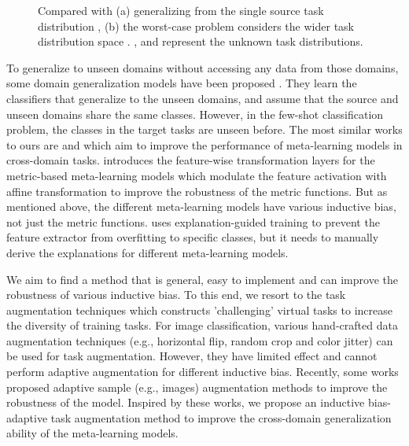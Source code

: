 \documentclass{article}
\begin{document}
\begin{figure}
    \centering
    \caption{Compared with (a) generalizing from the single source task distribution , (b) the worst-case problem considers the wider task distribution space . ,  and  represent the unknown task distributions.}
    \label{fig1}
\end{figure}

To generalize to unseen domains without accessing any data from those domains, some domain generalization models have been proposed \cite{volpi2018generalizing,DBLP:conf/icml/LiYZH19}. They learn the classifiers that generalize to the unseen domains, and assume that the source and unseen domains share the same classes. However, in the few-shot classification problem, the classes in the target tasks are unseen before. The most similar works to ours are \cite{DBLP:conf/iclr/TsengLH020} and \cite{sun2020explanation} which aim to improve the performance of meta-learning models in cross-domain tasks. \cite{DBLP:conf/iclr/TsengLH020} introduces the feature-wise transformation layers for the metric-based meta-learning models which modulate the feature activation with affine transformation to improve the robustness of the metric functions. But as mentioned above, the different meta-learning models have various inductive bias, not just the metric functions. \cite{sun2020explanation}
uses explanation-guided training to prevent the feature extractor from overfitting to specific classes, but it needs to manually derive the explanations for different meta-learning models.

We aim to find a method that is general, easy to implement and can improve the robustness of various inductive bias. To this end, we resort to the task augmentation techniques which constructs 'challenging' virtual tasks to increase the diversity of training tasks. For image classification, various hand-crafted data augmentation techniques (e.g., horizontal flip, random crop and color jitter) can be used for task augmentation. However, they have limited effect and cannot perform adaptive augmentation for different inductive bias. Recently, some works \cite{DBLP:conf/iclr/SinhaND18,volpi2018generalizing} proposed adaptive sample (e.g., images) augmentation methods to improve the robustness of the model. Inspired by these works, we propose an inductive bias-adaptive task augmentation method to improve the cross-domain generalization ability of the meta-learning models.
\end{document}
